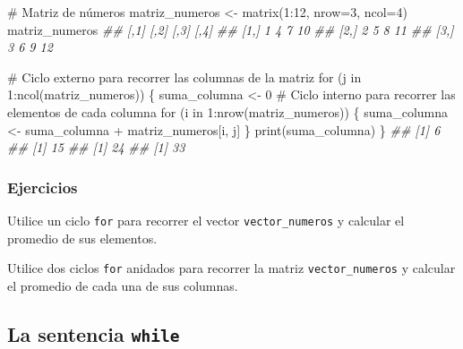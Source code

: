 \documentclass[
  letterpaper,
  DIV=11,
  numbers=noendperiod]{scrreprt}
\newenvironment{Shaded}{\begin{snugshade}}{\end{snugshade}}
\newcommand{\AttributeTok}[1]{\textcolor[rgb]{0.40,0.45,0.13}{#1}}
\newcommand{\CommentTok}[1]{\textcolor[rgb]{0.37,0.37,0.37}{#1}}
\newcommand{\ControlFlowTok}[1]{\textcolor[rgb]{0.00,0.23,0.31}{#1}}
\newcommand{\DecValTok}[1]{\textcolor[rgb]{0.68,0.00,0.00}{#1}}
\newcommand{\DocumentationTok}[1]{\textcolor[rgb]{0.37,0.37,0.37}{\textit{#1}}}
\newcommand{\FunctionTok}[1]{\textcolor[rgb]{0.28,0.35,0.67}{#1}}
\newcommand{\NormalTok}[1]{\textcolor[rgb]{0.00,0.23,0.31}{#1}}
\newcommand{\OtherTok}[1]{\textcolor[rgb]{0.00,0.23,0.31}{#1}}
\newcommand{\SpecialCharTok}[1]{\textcolor[rgb]{0.37,0.37,0.37}{#1}}
\begin{document}
\begin{Shaded}
\begin{Highlighting}[]
\CommentTok{\# Matriz de números}
\NormalTok{matriz\_numeros }\OtherTok{\textless{}{-}} \FunctionTok{matrix}\NormalTok{(}\DecValTok{1}\SpecialCharTok{:}\DecValTok{12}\NormalTok{, }\AttributeTok{nrow=}\DecValTok{3}\NormalTok{, }\AttributeTok{ncol=}\DecValTok{4}\NormalTok{)}
\NormalTok{matriz\_numeros}
\DocumentationTok{\#\#      [,1] [,2] [,3] [,4]}
\DocumentationTok{\#\# [1,]    1    4    7   10}
\DocumentationTok{\#\# [2,]    2    5    8   11}
\DocumentationTok{\#\# [3,]    3    6    9   12}

\CommentTok{\# Ciclo externo para recorrer las columnas de la matriz}
\ControlFlowTok{for}\NormalTok{ (j }\ControlFlowTok{in} \DecValTok{1}\SpecialCharTok{:}\FunctionTok{ncol}\NormalTok{(matriz\_numeros)) \{}
\NormalTok{  suma\_columna }\OtherTok{\textless{}{-}} \DecValTok{0}
  \CommentTok{\# Ciclo interno para recorrer las elementos de cada columna}
  \ControlFlowTok{for}\NormalTok{ (i }\ControlFlowTok{in} \DecValTok{1}\SpecialCharTok{:}\FunctionTok{nrow}\NormalTok{(matriz\_numeros)) \{}
\NormalTok{    suma\_columna }\OtherTok{\textless{}{-}}\NormalTok{ suma\_columna }\SpecialCharTok{+}\NormalTok{ matriz\_numeros[i, j]}
\NormalTok{  \}}
  \FunctionTok{print}\NormalTok{(suma\_columna)}
\NormalTok{\}}
\DocumentationTok{\#\# [1] 6}
\DocumentationTok{\#\# [1] 15}
\DocumentationTok{\#\# [1] 24}
\DocumentationTok{\#\# [1] 33}
\end{Highlighting}
\end{Shaded}

\hypertarget{ejercicios-7}{%
\subsubsection{Ejercicios}\label{ejercicios-7}}

Utilice un ciclo \texttt{for} para recorrer el vector
\texttt{vector\_numeros} y calcular el promedio de sus elementos.

Utilice dos ciclos \texttt{for} anidados para recorrer la matriz
\texttt{vector\_numeros} y calcular el promedio de cada una de sus
columnas.

\hypertarget{la-sentencia-while}{%
\subsection{\texorpdfstring{La sentencia
\texttt{while}}{La sentencia while}}\label{la-sentencia-while}}
\end{document}
